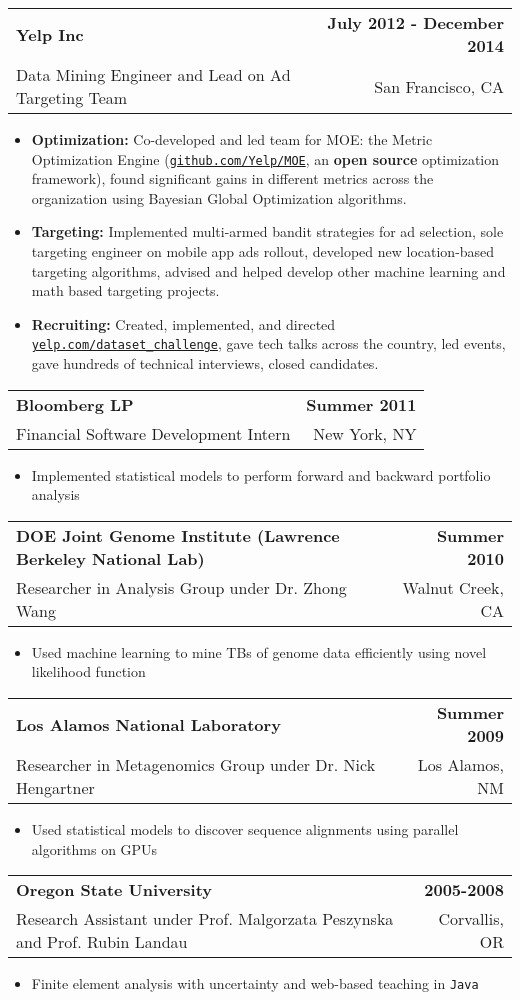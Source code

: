 \documentclass[letterpaper, 11pt]{article}
\makeatletter
\newcommand{\entry}[4]{%
  \begin{tabularx}{\linewidth}{@{}Xr@{}}
    \textbf{#1} & \textbf{#4} \\
    #3          & #2          \\
  \end{tabularx}
}
\newcommand{\website}[1]{\href{http://#1}{\texttt{#1}}}
\makeatother
\begin{document}
  \entry{Yelp Inc}{San Francisco, CA}{Data Mining Engineer and Lead on Ad Targeting Team}{July 2012 - December 2014}
  \begin{itemize}
    \item{{\bf Optimization:} Co-developed and led team for MOE: the Metric Optimization Engine (\website{github.com/Yelp/MOE}, an \textbf{open source} optimization framework), found significant gains in different metrics across the organization using Bayesian Global Optimization algorithms.}
    \item{{\bf Targeting:} Implemented multi-armed bandit strategies for ad selection, sole targeting engineer on mobile app ads rollout, developed new location-based targeting algorithms, advised and helped develop other machine learning and math based targeting projects.}
    \item{{\bf Recruiting:} Created, implemented, and directed \website{yelp.com/dataset\_challenge}, gave tech talks across the country, led events, gave hundreds of technical interviews, closed candidates.}
  \end{itemize}

  \entry{Bloomberg LP}{New York, NY}{Financial Software Development Intern}{Summer 2011}
  \begin{itemize}
    \item{Implemented statistical models to perform forward and backward portfolio analysis}
  \end{itemize}

  \entry{DOE Joint Genome Institute (Lawrence Berkeley National Lab)}{Walnut Creek, CA}{Researcher in Analysis Group under Dr. Zhong Wang}{Summer 2010}
  \begin{itemize}
    \item{Used machine learning to mine TBs of genome data efficiently using novel likelihood function}
  \end{itemize}

  \entry{Los Alamos National Laboratory}{Los Alamos, NM}{Researcher in Metagenomics Group under Dr. Nick Hengartner}{Summer 2009}
  \begin{itemize}
    \item{Used statistical models to discover sequence alignments using parallel algorithms on GPUs}
  \end{itemize}

  \entry{Oregon State University}{Corvallis, OR}{Research Assistant under Prof. Malgorzata Peszynska and Prof. Rubin Landau}{2005-2008}
  \begin{itemize}
    \item{Finite element analysis with uncertainty and web-based teaching in \texttt{Java}}
  \end{itemize}
\end{document}
